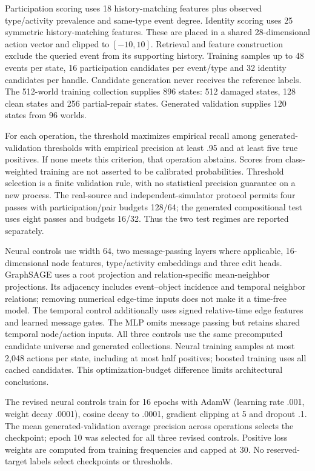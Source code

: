\documentclass[11pt]{article}
\begin{document}
Participation scoring uses 18 history-matching features plus observed type/activity prevalence and same-type event degree. Identity scoring uses 25 symmetric history-matching features. These are placed in a shared 28-dimensional action vector and clipped to $[-10,10]$. Retrieval and feature construction exclude the queried event from its supporting history. Training samples up to 48 events per state, 16 participation candidates per event/type and 32 identity candidates per handle. Candidate generation never receives the reference labels. The 512-world training collection supplies 896 states: 512 damaged states, 128 clean states and 256 partial-repair states. Generated validation supplies 120 states from 96 worlds.

For each operation, the threshold maximizes empirical recall among generated-validation thresholds with empirical precision at least .95 and at least five true positives. If none meets this criterion, that operation abstains. Scores from class-weighted training are not asserted to be calibrated probabilities. Threshold selection is a finite validation rule, with no statistical precision guarantee on a new process. The real-source and independent-simulator protocol permits four passes with participation/pair budgets 128/64; the generated compositional test uses eight passes and budgets 16/32. Thus the two test regimes are reported separately.

Neural controls use width 64, two message-passing layers where applicable, 16-dimensional node features, type/activity embeddings and three edit heads. GraphSAGE uses a root projection and relation-specific mean-neighbor projections. Its adjacency includes event--object incidence and temporal neighbor relations; removing numerical edge-time inputs does not make it a time-free model. The temporal control additionally uses signed relative-time edge features and learned message gates. The MLP omits message passing but retains shared temporal node/action inputs. All three controls use the same precomputed candidate universe and generated collections. Neural training samples at most 2,048 actions per state, including at most half positives; boosted training uses all cached candidates. This optimization-budget difference limits architectural conclusions.

The revised neural controls train for 16 epochs with AdamW (learning rate .001, weight decay .0001), cosine decay to .0001, gradient clipping at 5 and dropout .1. The mean generated-validation average precision across operations selects the checkpoint; epoch 10 was selected for all three revised controls. Positive loss weights are computed from training frequencies and capped at 30. No reserved-target labels select checkpoints or thresholds.
\end{document}
